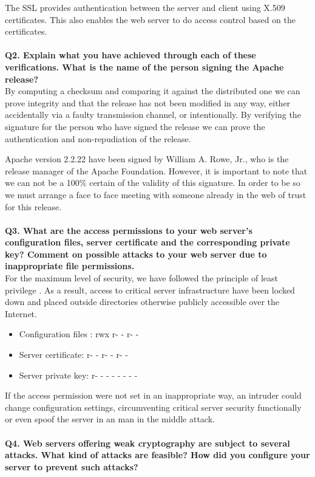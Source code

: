 \documentclass[a4paper, 12pt]{article}
\begin{document}
The SSL provides authentication between the server and client using X.509 certificates. This also enables the web server to do access control based on the certificates.
\\ \\
{\bf Q2. Explain what you have achieved through each of these verifications. What is the name
of the person signing the Apache release?} \\
By computing a checksum and comparing it against the distributed one we can prove integrity and that the release has not been modified in any way, either accidentally via a faulty transmission channel, or intentionally\cite{tre}. By verifying the signature for the person who have signed the release we can prove the authentication and non-repudiation of the release\cite{fire}.

Apache version 2.2.22 have been signed by William A. Rowe, Jr., who is the release manager of the Apache Foundation. However, it is important to note that we can not be a 100\% certain of the validity of this signature. In order to be so we must arrange a face to face meeting with someone already in the web of trust for this release\cite{fem}. 
\\ \\
{\bf Q3. What are the access permissions to your web server’s configuration files, server certificate
and the corresponding private key? Comment on possible attacks to your web server due to
inappropriate file permissions.} \\
For the maximum level of security, we have followed the principle of least privilege \cite{seks}. As a result, access to critical server infrastructure have been locked down and placed outside directories otherwise publicly accessible over the Internet. 
\begin{itemize}
\item Configuration files : rwx r- - r- -
\item Server certificate: r- - r- - r- -
\item Server private key: r- -  - - -  - - - 
\end{itemize}
If the access permission were not set in an inappropriate way, an intruder could change configuration settings, circumventing critical server security functionally or even spoof the server in an man in the middle attack.
\\ \\
{\bf Q4. Web servers offering weak cryptography are subject to several attacks. What kind of
attacks are feasible? How did you configure your server to prevent such attacks?} \\
\end{document}
